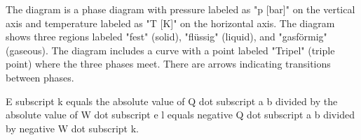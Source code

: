 The diagram is a phase diagram with pressure labeled as "p [bar]" on the vertical axis and temperature labeled as "T [K]" on the horizontal axis. The diagram shows three regions labeled "fest" (solid), "flüssig" (liquid), and "gasförmig" (gaseous). The diagram includes a curve with a point labeled "Tripel" (triple point) where the three phases meet. There are arrows indicating transitions between phases.

E subscript k equals the absolute value of Q dot subscript a b divided by the absolute value of W dot subscript e l equals negative Q dot subscript a b divided by negative W dot subscript k.